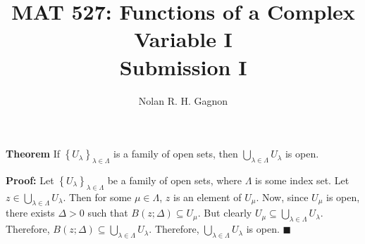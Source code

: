 \documentclass{article}
\title{MAT 527:  Functions of a Complex Variable I \\
	   \textbf{Submission I}}
\author{Nolan R. H. Gagnon}
\newcommand{\mybox}{%
    \collectbox{%
        \setlength{\fboxsep}{1pt}%
        \fbox{\BOXCONTENT}%
    }%
}
\begin{document}
\maketitle
\large
\noindent\mybox{\textbf{Theorem}} If $\left\lbrace U_{\lambda} \right\rbrace_{\lambda\in\Lambda}$ is a family of open sets, then $\bigcup_{\lambda\in\Lambda} U_{\lambda}$ is open.

\vspace{3mm}

\noindent\textbf{Proof:}  Let $\left\lbrace U_{\lambda} \right\rbrace_{\lambda\in\Lambda}$ be a family of open sets, where $\Lambda$ is some index set.  Let $z\in \bigcup_{\lambda\in\Lambda} U_{\lambda}$.  Then for some $\mu\in\Lambda$, $z$ is an element of $U_{\mu}$.  Now, since $U_{\mu}$ is open, there exists $\Delta >0$ such that $B(z;\Delta)\subseteq U_{\mu}$.  But clearly $U_{\mu}\subseteq \bigcup_{\lambda\in\Lambda} U_{\lambda}.$  Therefore, $B(z;\Delta)\subseteq \bigcup_{\lambda\in\Lambda} U_{\lambda}.$  Therefore, $\bigcup_{\lambda\in\Lambda} U_{\lambda}$ is open.
\hfill$\blacksquare$
\end{document}

